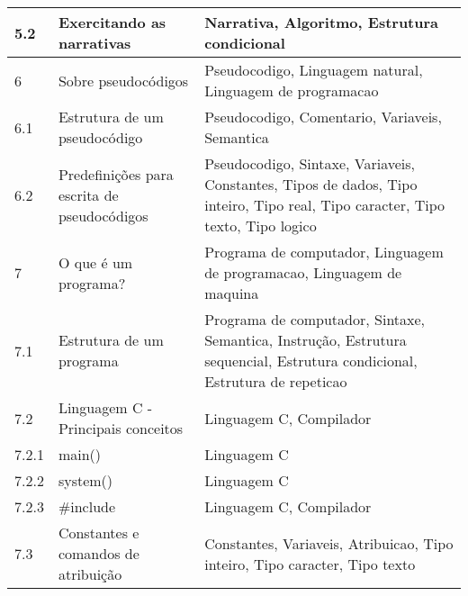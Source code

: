 \begin{longtable}{| p{} | p{} | p{} |}
5.2      & Exercitando as narrativas                                & Narrativa, Algoritmo, Estrutura condicional                                                                                   \\ \hline
6        & Sobre pseudocódigos                                      & Pseudocodigo, Linguagem natural, Linguagem de programacao                                                                     \\ \hline
6.1      & Estrutura de um pseudocódigo                             & Pseudocodigo, Comentario, Variaveis, Semantica                                                                                \\ \hline
6.2      & Predefinições para escrita de pseudocódigos              & Pseudocodigo, Sintaxe, Variaveis, Constantes, Tipos de dados, Tipo inteiro, Tipo real, Tipo caracter, Tipo texto, Tipo logico \\ \hline
7        & O que é um programa?                                     & Programa de computador, Linguagem de programacao, Linguagem de maquina                                                        \\ \hline
7.1      & Estrutura de um programa                                 & Programa de computador, Sintaxe, Semantica, Instrução, Estrutura sequencial, Estrutura condicional, Estrutura de repeticao    \\ \hline
7.2      & Linguagem C - Principais conceitos                       & Linguagem C, Compilador                                                                                                       \\ \hline
7.2.1    & main()                                                   & Linguagem C                                                                                                                   \\ \hline
7.2.2    & system()                                                 & Linguagem C                                                                                                                   \\ \hline
7.2.3    & \#include                                                & Linguagem C, Compilador                                                                                                       \\ \hline
7.3      & Constantes e comandos de atribuição                      & Constantes, Variaveis, Atribuicao, Tipo inteiro, Tipo caracter, Tipo texto                                                    \\ \hline

\end{longtable}
